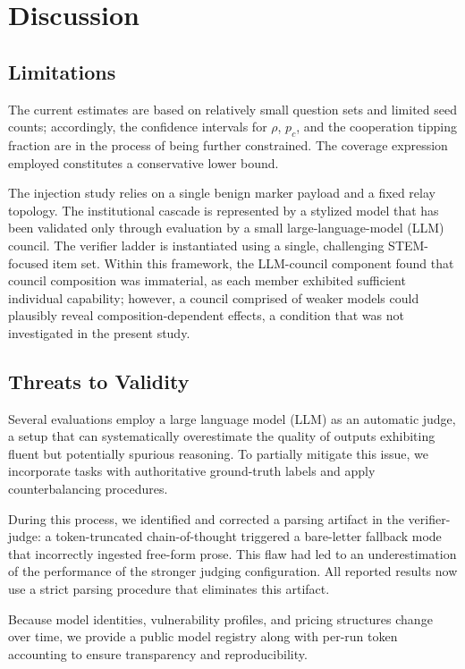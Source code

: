 \documentclass[manuscript,screen,review]{acmart}
\begin{document}
\section{Discussion}
\subsection{Limitations}
The current estimates are based on relatively small question sets and limited seed counts; accordingly, the confidence intervals for $\rho$, $p_c$, and the cooperation tipping fraction are in the process of being further constrained. The coverage expression employed constitutes a conservative lower bound.

The injection study relies on a single benign marker payload and a fixed relay topology. The institutional cascade is represented by a stylized model that has been validated only through evaluation by a small large-language-model (LLM) council. The verifier ladder is instantiated using a single, challenging STEM-focused item set. Within this framework, the LLM-council component found that council composition was immaterial, as each member exhibited sufficient individual capability; however, a council comprised of weaker models could plausibly reveal composition-dependent effects, a condition that was not investigated in the present study.

\subsection{Threats to Validity}
\label{sec:threats}
Several evaluations employ a large language model (LLM) as an automatic judge, a setup that can systematically overestimate the quality of outputs exhibiting fluent but potentially spurious reasoning. To partially mitigate this issue, we incorporate tasks with authoritative ground-truth labels and apply counterbalancing procedures. 

During this process, we identified and corrected a parsing artifact in the verifier-judge: a token-truncated chain-of-thought triggered a bare-letter fallback mode that incorrectly ingested free-form prose. This flaw had led to an underestimation of the performance of the stronger judging configuration. All reported results now use a strict parsing procedure that eliminates this artifact.

Because model identities, vulnerability profiles, and pricing structures change over time, we provide a public model registry along with per-run token accounting to ensure transparency and reproducibility.
\end{document}
